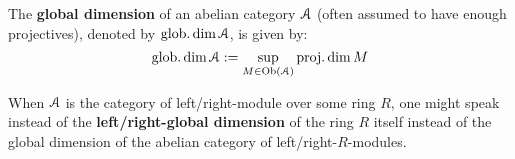             \begin{definition} \label{def: global_dimensions}
                The \textbf{global dimension} of an abelian category $\mathcal{A}$ (often assumed to have enough projectives), denoted by $\operatorname{glob.dim} \mathcal{A}$, is given by:
                    $$\operatorname{glob.dim} \mathcal{A} := \sup_{M \in \mathrm{Ob}(\mathcal{A})} \operatorname{proj.dim} M$$
            \end{definition}
            \begin{convention} \label{conv: global_dimensions_of_rings}
                When $\mathcal{A}$ is the category of left/right-module over some ring $R$, one might speak instead of the \textbf{left/right-global dimension} of the ring $R$ itself instead of the global dimension of the abelian category of left/right-$R$-modules. 
            \end{convention}
            
